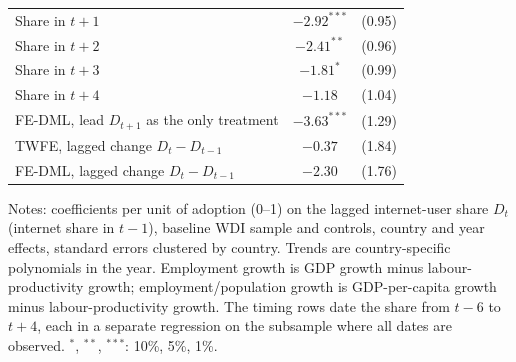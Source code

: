\documentclass[pdflatex,sn-basic]{sn-jnl}%
\theoremstyle{thmstyleone}
\theoremstyle{thmstyletwo}
\renewenvironment{table}[1][]{\begin{tableorg}[#1]\centering\tablebodyfont}{\end{tableorg}}
\begin{document}
\begin{appendices}
\begin{table}[!ht]
{\begin{threeparttable}
\begin{tabular}{lcc}
\quad Share in $t+1$ & $-2.92^{***}$ & (0.95)\\
\quad Share in $t+2$ & $-2.41^{**}$ & (0.96)\\
\quad Share in $t+3$ & $-1.81^{*}$ & (0.99)\\
\quad Share in $t+4$ & $-1.18$ & (1.04)\\
\addlinespace
FE-DML, lead $D_{t+1}$ as the only treatment & $-3.63^{***}$ & (1.29)\\
TWFE, lagged change $D_t-D_{t-1}$ & $-0.37$ & (1.84)\\
FE-DML, lagged change $D_t-D_{t-1}$ & $-2.30$ & (1.76)\\
\bottomrule
\end{tabular}
\begin{tablenotes}\scriptsize
\item Notes: coefficients per unit of adoption (0--1) on the lagged internet-user share $D_t$ (internet share in $t-1$), baseline WDI sample and controls, country and year effects, standard errors clustered by country. Trends are country-specific polynomials in the year. Employment growth is GDP growth minus labour-productivity growth; employment/population growth is GDP-per-capita growth minus labour-productivity growth. The timing rows date the share from $t-6$ to $t+4$, each in a separate regression on the subsample where all dates are observed. $^{*}$, $^{**}$, $^{***}$: 10\%, 5\%, 1\%.
\end{tablenotes}
\end{threeparttable}}
\end{table}

\begin{table}[!ht]
\centering
{}
\end{table}
\end{appendices}
\end{document}
